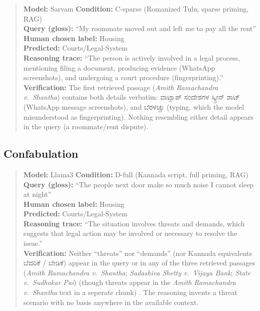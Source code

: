 \documentclass[11pt]{article}
\begin{document}
\begin{quote}
\textbf{Model:} Sarvam \quad \textbf{Condition:} C-sparse (Romanized Tulu, sparse priming, RAG) \\
\textbf{Query (gloss):} ``My roommate moved out and left me to pay all the rent'' \\
\textbf{Human chosen label:} Housing \\
\quad \textbf{Predicted:} Courts/Legal-System \\
\textbf{Reasoning trace:} ``The person is actively involved in a legal
process, mentioning filing a document, producing evidence (WhatsApp
screenshots), and undergoing a court procedure (fingerprinting).'' \\
\textbf{Verification:} The first retrieved passage
(\textit{Amith Ramachandra v.\ Shantha}) contains both details verbatim:
{\kannadafont ವಾಟ್ಸಾಪ್ ಸಂದೇಶಗಳ ಸ್ಕ್ರೀನ್ ಶಾಟ್} (WhatsApp message
screenshots), and ಬೆರಳಚ್ಚು (typing, which the model misunderstood as fingerprinting).  Nothing resembling either detail appears in the
query (a roommate/rent dispute).
\end{quote}


\subsection{Confabulation}
\label{app:confab}

\begin{quote}
\textbf{Model:} Llama3 \quad \textbf{Condition:} D-full (Kannada script, full priming, RAG) \\
\textbf{Query (gloss):} ``The people next door make so much noise I cannot sleep at night'' \\
\textbf{Human chosen label:} Housing \\
\quad \textbf{Predicted:} Courts/Legal-System \\
\textbf{Reasoning trace:} ``The situation involves threats and demands,
which suggests that legal action may be involved or necessary to resolve
the issue.'' \\
\textbf{Verification:} Neither ``threats'' nor ``demands'' (nor Kannada
equivalents {\kannadafont ಬೆದರಿಕೆ} / {\kannadafont ಬೇಡಿಕೆ}) appear in the
query or in any of the three retrieved passages (\textit{Amith
Ramachandra v.\ Shantha}; \textit{Sadashiva Shetty v.\ Vijaya Bank};
\textit{State v.\ Sudhakar Pai}) (though threats appear in the \textit{Amith
Ramachandra v.\ Shantha} text in a seperate chunk) . The reasoning invents a threat scenario
with no basis anywhere in the available context.
\end{quote}
\end{document}
